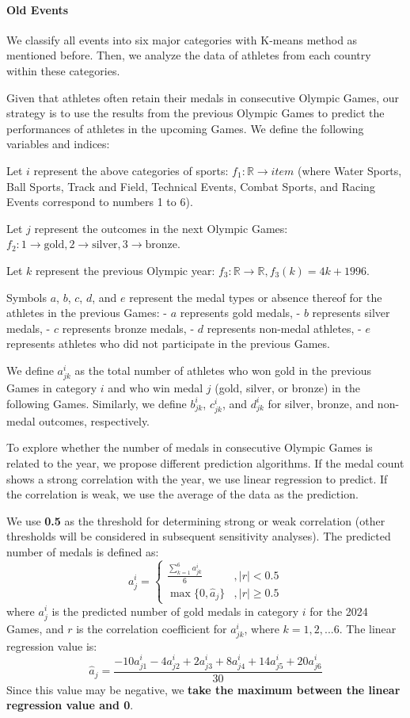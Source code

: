 \documentclass{mcmthesis}  %
\begin{document}
\paragraph{Old Events}
We classify all events into six major categories with K-means method as mentioned before. Then, we analyze the data of athletes from each country within these categories. 

Given that athletes often retain their medals in consecutive Olympic Games, our strategy is to use the results from the previous Olympic Games to predict the performances of athletes in the upcoming Games. We define the following variables and indices:

Let $i$ represent the above categories of sports: $f_1:\mathbb{R} \rightarrow item$ (where Water Sports, Ball Sports, Track and Field, Technical Events, Combat Sports, and Racing Events correspond to numbers 1 to 6).

Let $j$ represent the outcomes in the next Olympic Games: $f_2:1 \rightarrow \text{gold}, 2 \rightarrow \text{silver}, 3 \rightarrow \text{bronze}$.

Let $k$ represent the previous Olympic year: $f_3:\mathbb{R} \rightarrow \mathbb{R}, {f_3(k)=4k+1996}$.

Symbols $a$, $b$, $c$, $d$, and $e$ represent the medal types or absence thereof for the athletes in the previous Games:
- $a$ represents gold medals, 
- $b$ represents silver medals, 
- $c$ represents bronze medals, 
- $d$ represents non-medal athletes, 
- $e$ represents athletes who did not participate in the previous Games.

We define $a^i_{jk}$ as the total number of athletes who won gold in the previous Games in category $i$ and who win medal $j$ (gold, silver, or bronze) in the following Games. Similarly, we define $b^i_{jk}$, $c^i_{jk}$, and $d^i_{jk}$ for silver, bronze, and non-medal outcomes, respectively.

To explore whether the number of medals in consecutive Olympic Games is related to the year, we propose different prediction algorithms. If the medal count shows a strong correlation with the year, we use linear regression to predict. If the correlation is weak, we use the average of the data as the prediction.

We use \textbf{0.5} as the threshold for determining strong or weak correlation (other thresholds will be considered in subsequent sensitivity analyses). The predicted number of medals is defined as:
\[
a^i_j = 
\begin{cases} 
    \frac{\sum_{k=1}^{6}a^i_{jk}}{6} & , |r|  <0.5 \\
    \max\{0, \hat{a}_j\}  & , |r| \geq 0.5
\end{cases}
\]
where $a^i_j$ is the predicted number of gold medals in category $i$ for the 2024 Games, and \textbf{$r$} is the correlation coefficient for $a^i_{jk}$, where $k=1,2,...6$. The linear regression value is:
\[
\hat{a}_j = \frac{-10 a_{j1}^i - 4 a_{j2}^i + 2 a_{j3}^i + 8 a_{j4}^i + 14 a_{j5}^i + 20 a_{j6}^i}{30}
\]
Since this value may be negative, we \textbf{take the maximum between the linear regression value and 0}.
\end{document}
